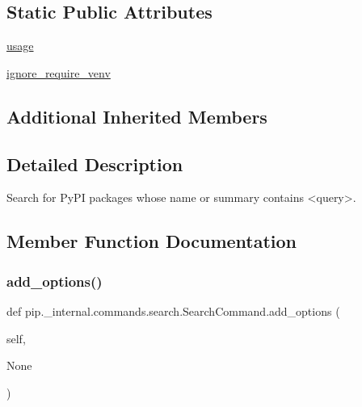 \subsection*{Static Public Attributes}
\begin{DoxyCompactItemize}
\item 
\hyperlink{classpip_1_1__internal_1_1commands_1_1search_1_1SearchCommand_a2611c1d15d4b28e26aa08a255a80bab7}{usage}
\item 
\hyperlink{classpip_1_1__internal_1_1commands_1_1search_1_1SearchCommand_ad8d0de0e14ff3c7c622c6a8fc9e3a44e}{ignore\+\_\+require\+\_\+venv}
\end{DoxyCompactItemize}
\subsection*{Additional Inherited Members}


\subsection{Detailed Description}
\begin{DoxyVerb}Search for PyPI packages whose name or summary contains <query>.\end{DoxyVerb}
 

\subsection{Member Function Documentation}
\mbox{\label{classpip_1_1__internal_1_1commands_1_1search_1_1SearchCommand_a380e80b4ddaf57b94794a8249835f88b}} 
\subsubsection{\texorpdfstring{add\+\_\+options()}{add\_options()}}
{\footnotesize\ttfamily def pip.\+\_\+internal.\+commands.\+search.\+Search\+Command.\+add\+\_\+options (\begin{DoxyParamCaption}\item[{}]{self,  }\item[{}]{None }\end{DoxyParamCaption})}

